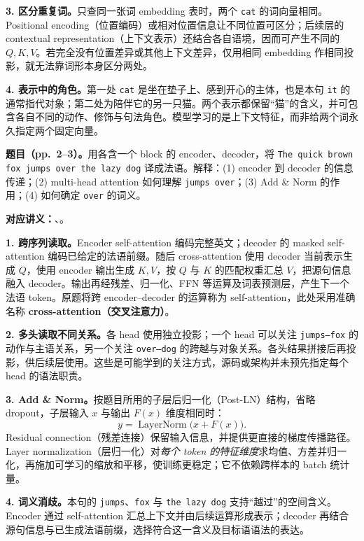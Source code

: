 \textbf{3. 区分重复词。}只查同一张词 embedding 表时，两个 \texttt{cat} 的词向量相同。Positional encoding（位置编码）或相对位置信息让不同位置可区分；后续层的 contextual representation（上下文表示）还结合各自语境，因而可产生不同的 $Q,K,V$。若完全没有位置差异或其他上下文差异，仅用相同 embedding 作相同投影，就无法靠词形本身区分两处。

\textbf{4. 表示中的角色。}第一处 \texttt{cat} 是坐在垫子上、感到开心的主体，也是本句 \texttt{it} 的通常指代对象；第二处为陪伴它的另一只猫。两个表示都保留“猫”的含义，并可包含各自不同的动作、修饰与句法角色。模型学习的是上下文特征，而非给两个词永久指定两个固定向量。

\nopagebreak[4]
\textbf{题目（pp.~2--3）。}用各含一个 block 的 encoder、decoder，将 \texttt{The quick brown fox jumps over the lazy dog} 译成法语。解释：(1) encoder 到 decoder 的信息传递；(2) multi-head attention 如何理解 \texttt{jumps over}；(3) Add \& Norm 的作用；(4) 如何确定 \texttt{over} 的词义。

\textbf{对应讲义：}、。

\textbf{1. 跨序列读取。}Encoder self-attention 编码完整英文；decoder 的 masked self-attention 编码已给定的法语前缀。随后 cross-attention 使用 decoder 当前表示生成 $Q$，使用 encoder 输出生成 $K,V$，按 $Q$ 与 $K$ 的匹配权重汇总 $V$，把源句信息融入 decoder。输出再经残差、归一化、FFN 等运算及词表预测层，产生下一个法语 token。原题将跨 encoder--decoder 的运算称为 self-attention，此处采用准确名称 \textbf{cross-attention（交叉注意力）}。

\textbf{2. 多头读取不同关系。}各 head 使用独立投影；一个 head 可以关注 \texttt{jumps--fox} 的动作与主语关系，另一个关注 \texttt{over--dog} 的跨越与对象关系。各头结果拼接后再投影，供后续层使用。这些是可能学到的关注方式，源码或架构并未预先指定每个 head 的语法职责。

\textbf{3. Add \& Norm。}按题目所用的子层后归一化（Post-LN）结构，省略 dropout，子层输入 $x$ 与输出 $F(x)$ 维度相同时：
\[
 y=\operatorname{LayerNorm}\bigl(x+F(x)\bigr).
\]
Residual connection（残差连接）保留输入信息，并提供更直接的梯度传播路径。Layer normalization（层归一化）对\emph{每个 token 的特征维度}求均值、方差并归一化，再施加可学习的缩放和平移，使训练更稳定；它不依赖跨样本的 batch 统计量。

\textbf{4. 词义消歧。}本句的 \texttt{jumps}、\texttt{fox} 与 \texttt{the lazy dog} 支持“越过”的空间含义。Encoder 通过 self-attention 汇总上下文并由后续运算形成表示；decoder 再结合源句信息与已生成法语前缀，选择符合这一含义及目标语语法的表达。

